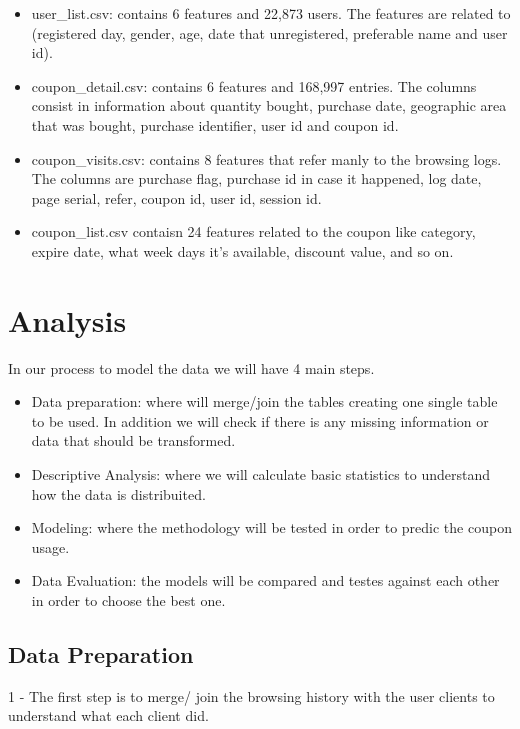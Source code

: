 \documentclass[]{article}
\begin{document}
\begin{itemize}
\itemsep1pt\parskip0pt
\item
  user\_list.csv: contains 6 features and 22,873 users. The features are
  related to (registered day, gender, age, date that unregistered,
  preferable name and user id).
\item
  coupon\_detail.csv: contains 6 features and 168,997 entries. The
  columns consist in information about quantity bought, purchase date,
  geographic area that was bought, purchase identifier, user id and
  coupon id.
\item
  coupon\_visits.csv: contains 8 features that refer manly to the
  browsing logs. The columns are purchase flag, purchase id in case it
  happened, log date, page serial, refer, coupon id, user id, session
  id.
\item
  coupon\_list.csv contaisn 24 features related to the coupon like
  category, expire date, what week days it's available, discount value,
  and so on.
\end{itemize}

\section{Analysis}\label{analysis}

In our process to model the data we will have 4 main steps.

\begin{itemize}
\itemsep1pt\parskip0pt
\item
  Data preparation: where will merge/join the tables creating one single
  table to be used. In addition we will check if there is any missing
  information or data that should be transformed.
\item
  Descriptive Analysis: where we will calculate basic statistics to
  understand how the data is distribuited.
\item
  Modeling: where the methodology will be tested in order to predic the
  coupon usage.
\item
  Data Evaluation: the models will be compared and testes against each
  other in order to choose the best one.
\end{itemize}

\subsection{Data Preparation}\label{data-preparation}

1 - The first step is to merge/ join the browsing history with the user
clients to understand what each client did.
\end{document}
